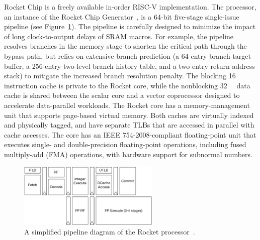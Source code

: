\documentclass[graybox]{svmult}
\begin{document}
Rocket Chip is a freely available in-order RISC-V implementation.
The processor, an instance of the Rocket Chip Generator~\cite{Rocket2016}, is a 64-bit five-stage single-issue pipeline (see Figure~\ref{fig:6-raven3-rocket}).
The pipeline is carefully designed to minimize the impact of long clock-to-output delays of SRAM macros.
For example, the pipeline resolves branches in the memory stage to shorten the critical path through the bypass path, but relies on extensive branch prediction (a 64-entry branch target buffer, a 256-entry two-level branch history table, and a two-entry return address stack) to mitigate the increased branch resolution penalty.
The blocking \SI{16}{\kibi\byte} instruction cache is private to the Rocket core, while the nonblocking \SI{32}{\kibi\byte} data cache is shared between the scalar core and a vector coprocessor designed to accelerate data-parallel workloads.
The Rocket core has a memory-management unit that supports page-based virtual memory.
Both caches are virtually indexed and physically tagged, and have separate TLBs that are accessed in parallel with cache accesses.
The core has an IEEE 754-2008-compliant floating-point unit that executes single- and double-precision floating-point operations, including fused multiply-add (FMA) operations, with hardware support for subnormal numbers.

\begin{figure}
  \centering
  \includegraphics[width=0.6\textwidth]{6-raven3-rocket}
  \caption{A simplified pipeline diagram of the Rocket processor~\cite{Rocket2016}.}
  \label{fig:6-raven3-rocket}
\end{figure}

\end{document}
